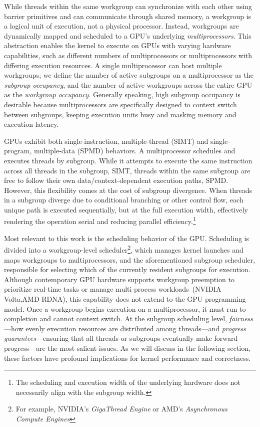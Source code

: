 \documentclass[sigconf]{acmart}
\begin{document}
While threads within the same workgroup can synchronize with each other using barrier primitives and can communicate through shared memory, a workgroup is a logical unit of execution, not a physical processor. Instead, workgroups are dynamically mapped and scheduled to a GPU's underlying \emph{multiprocessors}. This abstraction enables the kernel to execute on GPUs with varying hardware capabilities, such as different numbers of multiprocessors or multiprocessors with differing execution resources. A single multiprocessor can host multiple workgroups; we define the number of active subgroups on a multiprocessor as the \emph{subgroup occupancy}, and the number of active workgroups across the entire GPU as the \emph{workgroup occupancy}. Generally speaking, high subgroup occupancy is desirable because multiprocessors are specifically designed to context switch between subgroups, keeping execution units busy and masking memory and execution latency.

GPUs exhibit both single-instruction, multiple-thread (SIMT) and single-program, multiple-data (SPMD) behaviors. A multiprocessor schedules and executes threads by subgroup. While it attempts to execute the same instruction across all threads in the subgroup, SIMT, threads within the same subgroup are free to follow their own data/context-dependent execution paths, SPMD. However, this flexibility comes at the cost of subgroup divergence. When threads in a subgroup diverge due to conditional branching or other control flow, each unique path is executed sequentially, but at the full execution width, effectively rendering the operation serial and reducing parallel efficiency.\footnote{The scheduling and execution width of the underlying hardware does not necessarily align with the subgroup width.}

Most relevant to this work is the scheduling behavior of the GPU. Scheduling is divided into a workgroup-level scheduler\footnote{For example, NVIDIA's \emph{GigaThread Engine} or AMD's \emph{Asynchronous Compute Engines}}, which manages kernel launches and maps workgroups to multiprocessors, and the aforementioned subgroup scheduler, responsible for selecting which of the currently resident subgroups for execution. Although contemporary GPU hardware supports workgroup preemption to prioritize real-time tasks or manage multi-process workloads~\cite{}(NVIDIA Volta,AMD RDNA), this capability does not extend to the GPU programming model. Once a workgroup begins execution on a multiprocessor, it must run to completion and cannot context switch. At the subgroup scheduling level, \emph{fairness}—how evenly execution resources are distributed among threads—and \emph{progress guarantees}—ensuring that all threads or subgroups eventually make forward progress—are the most salient issues. As we will discuss in the following section, these factors have profound implications for kernel performance and correctness.
\end{document}
